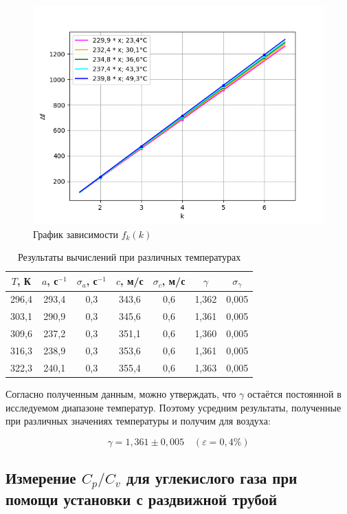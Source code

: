 \documentclass[12pt,a4paper]{article}
\begin{document}
 \begin{figure}[h!]
    \centering
    \includegraphics[scale=0.75]{plot.png}
    \caption {График зависимости $ f_k(k) $}
\end{figure}
\begin{table}[h!]
	\centering
	\begin{tabular}{|c|c|c|c|c|c|c|}
		\hline
		$ T $, К & $ a $, с$ ^{-1} $ & $ \sigma_a $, с$ ^{-1} $ & $ c $, м/с & $ \sigma_c $, м/с & $ \gamma $ & $ \sigma_\gamma $ \\ \hline
		296,4 & 293,4 & 0,3 & 343,6 & 0,6 & 1,362 & 0,005 \\ \hline
		303,1 & 290,9 & 0,3 & 345,6 & 0,6 & 1,361 & 0,005 \\ \hline
		309,6 & 237,2 & 0,3 & 351,1 & 0,6 & 1,360 & 0,005 \\ \hline
		316,3 & 238,9 & 0,3 & 353,6 & 0,6 & 1,361 & 0,005 \\ \hline
		322,3 & 240,1 & 0,3 & 355,4 & 0,6 & 1,363 & 0,005 \\ \hline
	\end{tabular}
	\caption{Результаты вычислений при различных температурах}
	\label{tab:resConstL}
\end{table}
Согласно полученным данным, можно утверждать, что $ \gamma $ остаётся постоянной в исследуемом диапазоне температур. Поэтому усредним результаты, полученные при различных значениях температуры и получим для воздуха:

\[ \boxed{\gamma = 1,361 \pm 0,005}\quad (\varepsilon=0,4\%) \]


\subsection{Измерение $ C_p/C_v $ для углекислого газа при помощи установки с раздвижной трубой}
\end{document}

